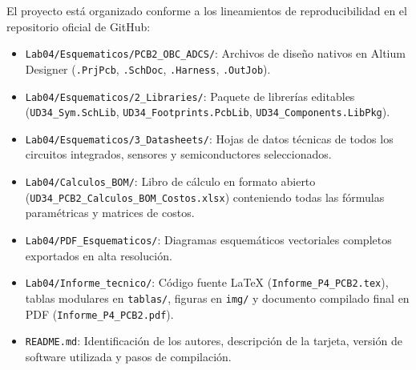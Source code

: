 \documentclass[11pt,a4paper]{article}
\begin{document}
El proyecto está organizado conforme a los lineamientos de reproducibilidad en el repositorio oficial de GitHub:
\begin{itemize}
    \item \texttt{Lab04/Esquematicos/PCB2\_OBC\_ADCS/}: Archivos de diseño nativos en Altium Designer (\texttt{.PrjPcb}, \texttt{.SchDoc}, \texttt{.Harness}, \texttt{.OutJob}).
    \item \texttt{Lab04/Esquematicos/2\_Libraries/}: Paquete de librerías editables (\texttt{UD34\_Sym.SchLib}, \texttt{UD34\_Footprints.PcbLib}, \texttt{UD34\_Components.LibPkg}).
    \item \texttt{Lab04/Esquematicos/3\_Datasheets/}: Hojas de datos técnicas de todos los circuitos integrados, sensores y semiconductores seleccionados.
    \item \texttt{Lab04/Calculos\_BOM/}: Libro de cálculo en formato abierto (\texttt{UD34\_PCB2\_Calculos\_BOM\_Costos.xlsx}) conteniendo todas las fórmulas paramétricas y matrices de costos.
    \item \texttt{Lab04/PDF\_Esquematicos/}: Diagramas esquemáticos vectoriales completos exportados en alta resolución.
    \item \texttt{Lab04/Informe\_tecnico/}: Código fuente LaTeX (\texttt{Informe\_P4\_PCB2.tex}), tablas modulares en \texttt{tablas/}, figuras en \texttt{img/} y documento compilado final en PDF (\texttt{Informe\_P4\_PCB2.pdf}).
    \item \texttt{README.md}: Identificación de los autores, descripción de la tarjeta, versión de software utilizada y pasos de compilación.
\end{itemize}

\end{document}
